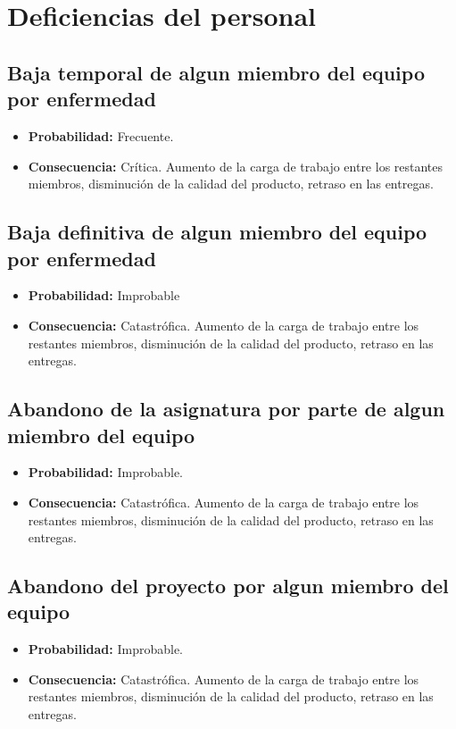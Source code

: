 \documentclass[spanish,a4paper,12pt]{report}	%
\begin{document}
\section{Deficiencias del personal}
%

\subsection*{Baja temporal de algun miembro del equipo por enfermedad}
	\begin{itemize}
		\item \textbf {Probabilidad: }Frecuente.
		\item \textbf {Consecuencia: }Crítica. Aumento de la carga de trabajo entre los restantes miembros, disminución de la calidad del producto, retraso en las entregas.
	\end{itemize}

\subsection*{Baja definitiva de algun miembro del equipo por enfermedad}	
	\begin{itemize}
		\item \textbf {Probabilidad: }Improbable
		\item \textbf {Consecuencia: }Catastrófica. Aumento de la carga de trabajo entre los restantes miembros, disminución de la calidad del producto, retraso en las entregas.
	\end{itemize}

\subsection*{Abandono de la asignatura por parte de algun miembro del equipo}	
	\begin{itemize}
		\item \textbf {Probabilidad: }Improbable.
		\item \textbf {Consecuencia: }Catastrófica. Aumento de la carga de trabajo entre los restantes miembros, disminución de la calidad del producto, retraso en las entregas.
	\end{itemize}

\subsection*{Abandono del proyecto por algun miembro del equipo}	
	\begin{itemize}
		\item \textbf {Probabilidad: }Improbable.
		\item \textbf {Consecuencia: }Catastrófica. Aumento de la carga de trabajo entre los restantes miembros, disminución de la calidad del producto, retraso en las entregas.
	\end{itemize}
\end{document}
